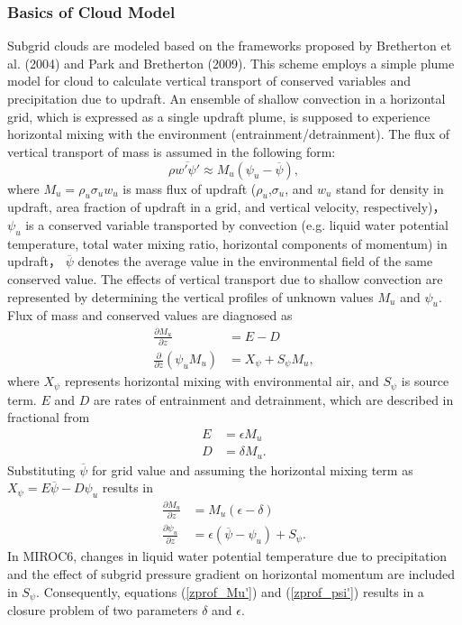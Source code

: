 \subsubsection{Basics of Cloud Model}\label{basics-of-cloud-model}
Subgrid clouds are modeled based on the frameworks proposed by Bretherton et al. (2004) and Park and Bretherton (2009).
This scheme employs a simple plume model for cloud to calculate vertical transport of conserved variables and precipitation due to updraft.
An ensemble of shallow convection in a horizontal grid, which is expressed as a single updraft plume, is supposed to experience horizontal mixing with the environment
(entrainment/detrainment). The flux of vertical transport of mass is assumed in the following form:
\begin{equation}\label{def_Mu}
    \rho \overline {w' \psi '}\approx M_u (\psi_u-\overline{\psi}) ,
\end{equation}
where $M_u=\rho_u\sigma_u w_u$ is mass flux of updraft ($\rho_u$,$\sigma_u$, and $w_u$ stand for density in updraft, area fraction of updraft in a grid, and vertical velocity, respectively)，
$\psi_u$ is a conserved variable transported by convection (e.g. liquid water potential temperature, total water mixing ratio, horizontal components of momentum) in updraft，
$\overline{\psi}$ denotes the average value in the environmental field of the same conserved value.
The effects of vertical transport due to shallow convection are represented by determining the vertical profiles of unknown values $M_u$ and $\psi_u$.
Flux of mass and conserved values are diagnosed as
\begin{align}
    \frac{\partial M_u}{\partial z} &= E - D \label{zprof_Mu}\\
    \frac{\partial}{\partial z} (\psi_u M_u) &= X_\psi + S_\psi M_u,\label{zprof_psi}
\end{align}
where $X_\psi$ represents horizontal mixing with environmental air, and $S_\psi$ is source term. $E$ and $D$ are rates of entrainment and detrainment, which are described in fractional from
\begin{align}
    E &=\epsilon M_u \label{fracE}\\
    D &=\delta M_u. \label{fracD}
\end{align}
Substituting $\overline{\psi}$ for grid value and assuming the horizontal mixing term as $X_{\psi}=E \overline{\psi} - D\psi_u$ results in
\begin{align}
    \frac{\partial M_u}{\partial z} &= M_u (\epsilon - \delta) \label{zprof_Mu'}\\
    \frac{\partial \psi_u}{\partial z} &= \epsilon(\overline{\psi} - \psi_u) + S_{\psi}. \label{zprof_psi'}
\end{align}
In MIROC6, changes in liquid water potential temperature due to precipitation and the effect of subgrid pressure gradient on horizontal momentum are included in $S_{\psi}$.
Consequently, equations (\ref{zprof_Mu'}) and (\ref{zprof_psi'}) results in a closure problem of two parameters $\delta$ and $\epsilon$.


